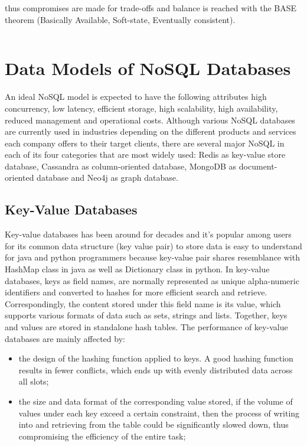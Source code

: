 thus compromises are made for trade-offs and balance is reached with the BASE theorem (Basically Available, Soft-state, Eventually consistent)\cite{neo}.

\[\]

\section{Data Models of NoSQL Databases}

An ideal NoSQL model is expected to have the following attributes  high concurrency, low latency, efficient storage, high scalability, high
availability, reduced management and operational costs\cite{DBLP:journals/corr/Sharma15b}. Although various NoSQL databases are currently used in industries depending on the different products and services each company offers to their target clients, there are several major NoSQL in each of its four categories that are most widely used: Redis as key-value store database, Cassandra as column-oriented database, MongoDB as document-oriented database and Neo4j as graph database.

\subsection{Key-Value Databases}

Key-value databases has been around for decades and it's popular among users for its common data structure (key value pair) to store data is easy to understand for java and python programmers because key-value pair shares resemblance with HashMap class in java as well as Dictionary class in python. In key-value databases, keys as field names, are normally represented as unique alpha-numeric identifiers and converted to hashes for more efficient search and retrieve. Correspondingly, the content stored under this field name is its value, which supports various formats of data such as sets, strings and lists. Together, keys and values are stored in standalone hash tables. The performance of key-value databases are mainly affected by:

\begin{itemize}
	\item the design of the hashing function applied to keys. A good hashing function results in fewer conflicts, which ends up with evenly distributed data across all slots;
	\item the size and data format of the corresponding value stored, if the volume of values under each key exceed a certain constraint, then the process of writing into and retrieving from the table could be significantly slowed down, thus compromising the efficiency of the entire task;
\end{itemize}

